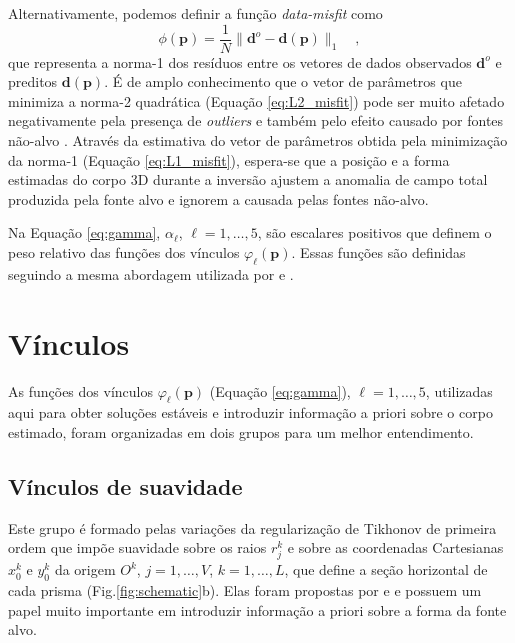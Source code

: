 Alternativamente, podemos definir a função \textit{data-misfit} como
\begin{equation}\label{eq:L1_misfit}
\phi (\mathbf{p}) = \frac{1}{N} 
\| \mathbf{d}^{o} - \mathbf{d}(\mathbf{p}) \|_{1} \quad ,
\end{equation}
que representa a norma-1 \citep[por exemplo,][p. 331]{aster_etal2019}
dos resíduos entre os vetores de dados observados $\mathbf{d}^{o}$ e preditos $\mathbf{d}(\mathbf{p})$.
É de amplo conhecimento que o vetor de parâmetros que minimiza a norma-2 quadrática (Equação \ref{eq:L2_misfit}) pode ser muito afetado negativamente pela presença de \textit{outliers} e também pelo efeito causado por fontes não-alvo \cite[por exemplo,][]{claerbout_muir1973, 
	silva_hohmann1983, scales_gersztenkorn1988, silva_cutrim1989, farquharson_oldenburg1998, 
	uieda_barbosa2012, oliveirajr_etal2015, aster_etal2019}.
Através da estimativa do vetor de parâmetros obtida pela minimização da norma-1 (Equação \ref{eq:L1_misfit}), espera-se que a posição e a forma estimadas do corpo 3D durante a inversão ajustem a anomalia de campo total produzida pela fonte alvo e ignorem a causada pelas fontes não-alvo.

Na Equação \ref{eq:gamma}, $\alpha_{\ell}$, $\ell = 1, \dots, 5$, são escalares positivos que definem o peso relativo das funções dos vínculos $\varphi_{\ell}(\mathbf{p})$.
Essas funções são definidas seguindo a mesma abordagem utilizada por \citet{oliveirajr_etal2011} e \citet{oliveirajr_barbosa2013}.

\section{Vínculos}\label{sec:constraints}

As funções dos vínculos $\varphi_{\ell}(\mathbf{p})$ (Equação \ref{eq:gamma}), $\ell = 1, \dots, 5$, utilizadas aqui para obter soluções estáveis e introduzir informação a priori sobre o corpo estimado, foram organizadas em dois grupos para um melhor entendimento.

\subsection{Vínculos de suavidade}

Este grupo é formado pelas variações da regularização de Tikhonov de primeira ordem \cite[][ p. 103]{aster_etal2019} que impõe suavidade sobre os raios $r_{j}^{k}$ e sobre as coordenadas Cartesianas $x_{0}^{k}$ e $y_{0}^{k}$ da origem $O^{k}$, $j = 1, \dots, V$, $k = 1, \dots, L$, que define a seção horizontal de cada prisma (Fig.\ref{fig:schematic}b).
Elas foram propostas por \cite{oliveirajr_etal2011} e \cite{oliveirajr_barbosa2013} e possuem um papel muito importante em introduzir informação a priori sobre a forma da fonte alvo. 

